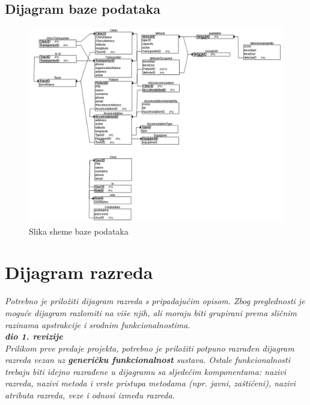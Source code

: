 			\subsection{Dijagram baze podataka}
				\begin{figure}[H]
					\includegraphics[width=\textwidth]{slike/DB_scheme.PNG} %
					\caption{Slika sheme baze podataka}
					\label{fig:db_scheme} %
				\end{figure}
			
			\eject
			
			
		\section{Dijagram razreda}
		
			\textit{Potrebno je priložiti dijagram razreda s pripadajućim opisom. Zbog preglednosti je moguće dijagram razlomiti na više njih, ali moraju biti grupirani prema sličnim razinama apstrakcije i srodnim funkcionalnostima.}\\
			
			\textbf{\textit{dio 1. revizije}}\\
			
			\textit{Prilikom prve predaje projekta, potrebno je priložiti potpuno razrađen dijagram razreda vezan uz \textbf{generičku funkcionalnost} sustava. Ostale funkcionalnosti trebaju biti idejno razrađene u dijagramu sa sljedećim komponentama: nazivi razreda, nazivi metoda i vrste pristupa metodama (npr. javni, zaštićeni), nazivi atributa razreda, veze i odnosi između razreda.}\\
			
